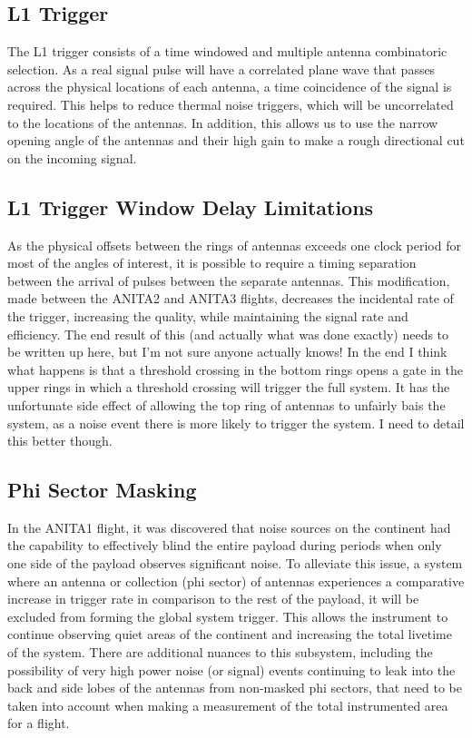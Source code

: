 	\subsection{L1 Trigger}
		The L1 trigger consists of a time windowed and multiple antenna combinatoric selection.  As a real signal pulse will have a correlated plane wave that passes across the physical locations of each antenna, a time coincidence of the signal is required.  This helps to reduce thermal noise triggers, which will be uncorrelated to the locations of the antennas.  In addition, this allows us to use the narrow opening angle of the antennas and their high gain to make a rough directional cut on the incoming signal.
	\subsection{L1 Trigger Window Delay Limitations}
		As the physical offsets between the rings of antennas exceeds one clock period for most of the angles of interest, it is possible to require a timing separation between the arrival of pulses between the separate antennas.  This modification, made between the ANITA2 and ANITA3 flights, decreases the incidental rate of the trigger, increasing the quality, while maintaining the signal rate and efficiency.  The end result of this (and actually what was done exactly) needs to be written up here, but I'm not sure anyone actually knows!  In the end I think what happens is that a threshold crossing in the bottom rings opens a gate in the upper rings in which a threshold crossing will trigger the full system.  It has the unfortunate side effect of allowing the top ring of antennas to unfairly bais the system, as a noise event there is more likely to trigger the system.  I need to detail this better though.

	\subsection{Phi Sector Masking}
		In the ANITA1 flight, it was discovered that noise sources on the continent had the capability to effectively blind the entire payload during periods when only one side of the payload observes significant noise.  To alleviate this issue, a system where an antenna or collection (phi sector) of antennas experiences a comparative increase in trigger rate in comparison to the rest of the payload, it will be excluded from forming the global system trigger.  This allows the instrument to continue observing quiet areas of the continent and increasing the total livetime of the system.  There are additional nuances to this subsystem, including the possibility of very high power noise (or signal) events continuing to leak into the back and side lobes of the antennas from non-masked phi sectors, that need to be taken into account when making a measurement of the total instrumented area for a flight.
		
